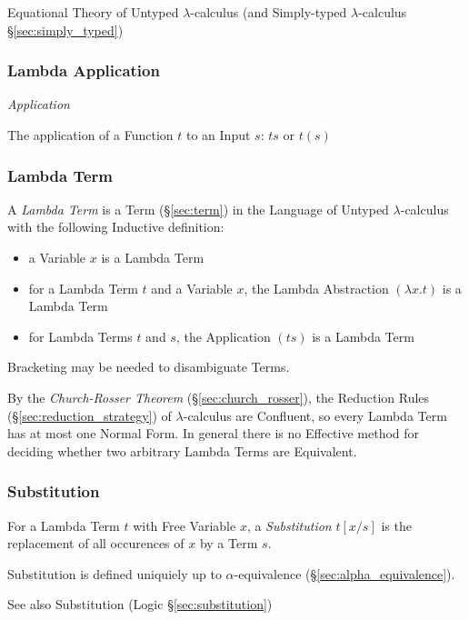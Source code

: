 Equational Theory of Untyped $\lambda$-calculus (and Simply-typed
$\lambda$-calculus \S\ref{sec:simply_typed})



\subsubsection{Lambda Application}\label{sec:lambda_application}

\emph{Application}

The application of a Function $t$ to an Input $s$: $ts$ or $t(s)$



\subsubsection{Lambda Term}\label{sec:lambda_term}

A \emph{Lambda Term} is a Term (\S\ref{sec:term}) in the Language of
Untyped $\lambda$-calculus with the following Inductive definition:
\begin{itemize}
  \item a Variable $x$ is a Lambda Term
  \item for a Lambda Term $t$ and a Variable $x$, the Lambda
    Abstraction $(\lambda x.t)$ is a Lambda Term
  \item for Lambda Terms $t$ and $s$, the Application $(ts)$ is a
    Lambda Term
\end{itemize}
Bracketing may be needed to disambiguate Terms.

By the \emph{Church-Rosser Theorem} (\S\ref{sec:church_rosser}), the
Reduction Rules (\S\ref{sec:reduction_strategy}) of $\lambda$-calculus
are Confluent, so every Lambda Term has at most one Normal Form. In
general there is no Effective method for deciding whether two
arbitrary Lambda Terms are Equivalent.




\subsubsection{Substitution}\label{sec:lambda_substitution}

For a Lambda Term $t$ with Free Variable $x$, a \emph{Substitution}
$t[x/s]$ is the replacement of all occurences of $x$ by a Term $s$.

Substitution is defined uniquiely up to $\alpha$-equivalence
(\S\ref{sec:alpha_equivalence}).

\fist See also Substitution (Logic \S\ref{sec:substitution})



